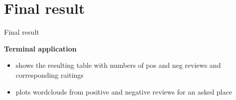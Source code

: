 \section{Final result}
\begin{frame}{Final result}
\begin{center}
\Large \textbf{Terminal application}
\begin{itemize}
    \item shows the resulting table with numbers of pos and neg reviews  and corresponding raitings
    \item plots wordclouds from positive and negative reviews for an asked  place
\end{itemize}
\end{center}
\end{frame}